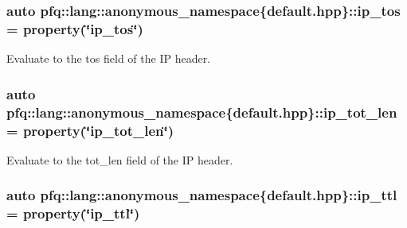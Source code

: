 \subsubsection[{\texorpdfstring{ip\+\_\+tos}{ip_tos}}]{\setlength{\rightskip}{0pt plus 5cm}auto pfq\+::lang\+::anonymous\+\_\+namespace\{default.\+hpp\}\+::ip\+\_\+tos = {\bf property}(\char`\"{}ip\+\_\+tos\char`\"{})}\hypertarget{namespacepfq_1_1lang_1_1anonymous__namespace_02default_8hpp_03_acc5d2b786c39d4177ab37ee16ee2295d}{}\label{namespacepfq_1_1lang_1_1anonymous__namespace_02default_8hpp_03_acc5d2b786c39d4177ab37ee16ee2295d}


Evaluate to the {\ttfamily tos} field of the IP header. 

\subsubsection[{\texorpdfstring{ip\+\_\+tot\+\_\+len}{ip_tot_len}}]{\setlength{\rightskip}{0pt plus 5cm}auto pfq\+::lang\+::anonymous\+\_\+namespace\{default.\+hpp\}\+::ip\+\_\+tot\+\_\+len = {\bf property}(\char`\"{}ip\+\_\+tot\+\_\+len\char`\"{})}\hypertarget{namespacepfq_1_1lang_1_1anonymous__namespace_02default_8hpp_03_a48d42ce1bea31f55be3377e8f2c41bbe}{}\label{namespacepfq_1_1lang_1_1anonymous__namespace_02default_8hpp_03_a48d42ce1bea31f55be3377e8f2c41bbe}


Evaluate to the {\ttfamily tot\+\_\+len} field of the IP header. 

\subsubsection[{\texorpdfstring{ip\+\_\+ttl}{ip_ttl}}]{\setlength{\rightskip}{0pt plus 5cm}auto pfq\+::lang\+::anonymous\+\_\+namespace\{default.\+hpp\}\+::ip\+\_\+ttl = {\bf property}(\char`\"{}ip\+\_\+ttl\char`\"{})}\hypertarget{namespacepfq_1_1lang_1_1anonymous__namespace_02default_8hpp_03_a885339d6e5b34ec5d037e085dfba9851}{}\label{namespacepfq_1_1lang_1_1anonymous__namespace_02default_8hpp_03_a885339d6e5b34ec5d037e085dfba9851}


